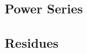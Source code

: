 \begin{theorem}
\end{theorem}

\begin{definition}
\end{definition}

\begin{theorem}
\end{theorem}

\begin{theorem}
\end{theorem}

\subsection{Power Series}

\subsection{Residues}
